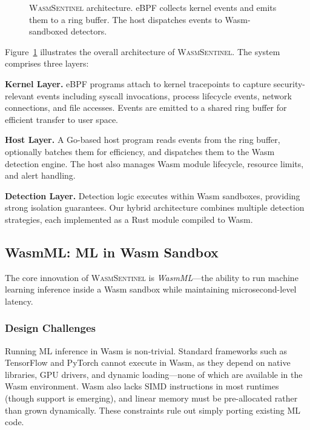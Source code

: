 \begin{figure}[t]
\caption{\textsc{WasmSentinel} architecture. eBPF collects kernel events and emits them to a ring buffer. The host dispatches events to Wasm-sandboxed detectors.}
\label{fig:architecture}
\end{figure}

Figure~\ref{fig:architecture} illustrates the overall architecture of \textsc{WasmSentinel}.
The system comprises three layers:

\textbf{Kernel Layer.}
eBPF programs attach to kernel tracepoints to capture security-relevant events including syscall invocations, process lifecycle events, network connections, and file accesses.
Events are emitted to a shared ring buffer for efficient transfer to user space.

\textbf{Host Layer.}
A Go-based host program reads events from the ring buffer, optionally batches them for efficiency, and dispatches them to the Wasm detection engine.
The host also manages Wasm module lifecycle, resource limits, and alert handling.

\textbf{Detection Layer.}
Detection logic executes within Wasm sandboxes, providing strong isolation guarantees.
Our hybrid architecture combines multiple detection strategies, each implemented as a Rust module compiled to Wasm.

\subsection{WasmML: ML in Wasm Sandbox}
\label{sec:design-wasmml}

The core innovation of \textsc{WasmSentinel} is \textit{WasmML}---the ability to run machine learning inference inside a Wasm sandbox while maintaining microsecond-level latency.

\subsubsection{Design Challenges}

Running ML inference in Wasm is non-trivial.
Standard frameworks such as TensorFlow and PyTorch cannot execute in Wasm, as they depend on native libraries, GPU drivers, and dynamic loading---none of which are available in the Wasm environment.
Wasm also lacks SIMD instructions in most runtimes (though support is emerging), and linear memory must be pre-allocated rather than grown dynamically.
These constraints rule out simply porting existing ML code.

